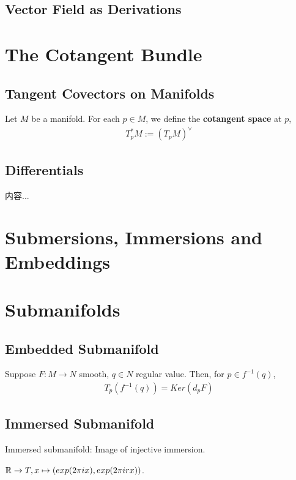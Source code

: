 \documentclass[Total.tex]{subfiles}
\begin{document}
		\section{Vector Field as Derivations}
	\chapter{The Cotangent Bundle}
		\section{Tangent Covectors on Manifolds}
			\begin{Def}
				Let $M$ be a manifold. For each $p\in M$, we define the \textbf{cotangent space} at $p$, 
				\begin{gather*}
					T_p^*M:=(T_p M)^\vee
				\end{gather*}
			\end{Def}
		\section{Differentials}
			
			\begin{Def}
				内容...
			\end{Def}
	\chapter{Submersions, Immersions and Embeddings}
	\chapter{Submanifolds}
		\section{Embedded Submanifold}
			\begin{proposition}
				Suppose $F:M\rightarrow N$ smooth, $q\in N$ regular value. Then, for $p\in f^{-1}(q)$,
				\begin{gather*}
					T_p(f^{-1}(q))=Ker(d_p F)
				\end{gather*}
			\end{proposition}
		\section{Immersed Submanifold}
			\begin{Def}
				Immersed submanifold: Image of injective immersion.
			\end{Def}
			\begin{example}
				$\mathbb{R}\rightarrow T,x\mapsto (exp(2\pi ix),exp(2\pi i r x))$. 
			\end{example}
			
\end{document}

